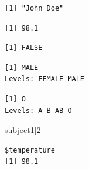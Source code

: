 \documentclass[
  letterpaper,
  DIV=11,
  numbers=noendperiod]{scrartcl}
\newenvironment{Shaded}{\begin{snugshade}}{\end{snugshade}}
\newcommand{\DecValTok}[1]{\textcolor[rgb]{0.68,0.00,0.00}{#1}}
\newcommand{\NormalTok}[1]{\textcolor[rgb]{0.00,0.23,0.31}{#1}}
\newcommand{\SpecialCharTok}[1]{\textcolor[rgb]{0.37,0.37,0.37}{#1}}
\begin{document}
\begin{verbatim}
[1] "John Doe"
\end{verbatim}

\begin{Shaded}
\end{Shaded}

\begin{verbatim}
[1] 98.1
\end{verbatim}

\begin{Shaded}
\end{Shaded}

\begin{verbatim}
[1] FALSE
\end{verbatim}

\begin{Shaded}
\end{Shaded}

\begin{verbatim}
[1] MALE
Levels: FEMALE MALE
\end{verbatim}

\begin{Shaded}
\end{Shaded}

\begin{verbatim}
[1] O
Levels: A B AB O
\end{verbatim}

\begin{Shaded}
\begin{Highlighting}[]
\NormalTok{subject1[}\DecValTok{2}\NormalTok{]}
\end{Highlighting}
\end{Shaded}

\begin{verbatim}
$temperature
[1] 98.1
\end{verbatim}
\end{document}
